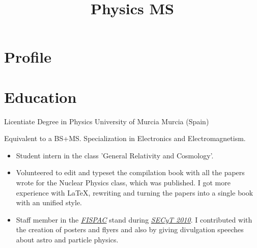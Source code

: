 \documentclass[11pt,a4paper,roman]{moderncv}
\title{Physics MS}
\begin{document}
\maketitle



\section{Profile}

\section{Education}

	{Licentiate Degree in Physics}
	{University of Murcia}
	{Murcia (Spain)}
	{}
	{Equivalent to a BS+MS. Specialization in Electronics and Electromagnetism.
	\begin{itemize}
		\item Student intern in the class 'General Relativity and Cosmology'.
		\item Volunteered to edit and typeset the compilation book with all the 
		papers wrote for the Nuclear Physics class, which was published. I got 
		more experience with \LaTeX, rewriting and turning the 
		papers into a single book with an unified style.
		\item Staff member in the \textit{\href{http://www.um.es/fispac/}
		{FISPAC}} stand during \textit{\href{http://www.f-
		seneca.org/secyt10/home.php}{SECyT 2010}}. I contributed with the creation 
		of posters and flyers and also by giving divulgation speeches about astro 
		and particle physics.
	\end{itemize}	
	}
\end{document}
